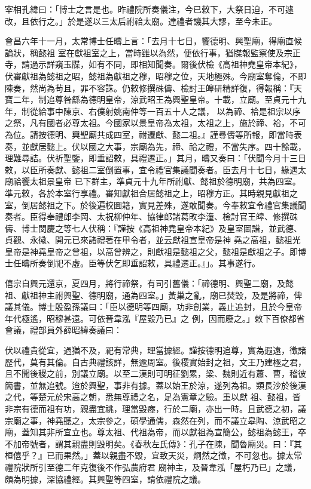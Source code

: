 \begin{pinyinscope}
 宰相孔緯曰：「博士之言是也。昨禮院所奏儀注，今已敕下，大祭日迫，不可遽改，且依行之。」於是遂以三太后祔祫太廟。達禮者譏其大謬，至今未正。



 會昌六年十一月，太常博士任疇上言：「去月十七日，饗德明、興聖廟，得廟直候論狀，稱懿祖
 室在獻祖室之上，當時雖以為然，便依行事，猶牒報監察使及宗正寺，請過示詳窺玉牒，如有不同，即相知聞奏。爾後伏檢《高祖神堯皇帝本紀》，伏審獻祖為懿祖之昭，懿祖為獻祖之穆，昭穆之位，天地極殊。今廟室奪倫，不即陳奏，然尚為茍且，罪不容誅。仍敕修撰硃儔、檢討王皞研精詳復，得報稱：『天寶二年，制追尊咎繇為德明皇帝，涼武昭王為興聖皇帝。十載，立廟。至貞元十九年，制從給事中陳京、右僕射姚南仲等一百五十人之議，
 以為禘、袷是祖宗以序之祭，凡有國者必尊太祖。今國家以景皇帝為太祖，太祖之上，施於禘、袷，不可為位。請按德明、興聖廟共成四室，祔遷獻、懿二祖。』謹尋儔等所報，即當時表奏，並獻居懿上。伏以國之大事，宗廟為先，禘、祫之禮，不當失序。四十餘載，理難尋詰。伏祈聖鑒，即垂詔敕，具禮遷正。」其月，疇又奏曰：「伏聞今月十三日敕，以臣所奏獻、懿祖二室倒置事，宜令禮官集議聞奏者。臣去月十七日，緣遇太廟祫饗太祖景皇帝
 已下群主，準貞元十九年所祔獻、懿祖於德明廟，共為四室。準元敕，各於本室行享禮。審知獻祖合居懿祖之上，昭穆方正。其時親見獻祖之室，倒居懿祖之下。於後遍校圖籍，實見差殊，遂敢聞奏。今奉敕宜令禮官集議聞奏者。臣得奉禮郎李岡、太祝柳仲年、協律郎諸葛畋李潼、檢討官王皞、修撰硃儔、博士閔慶之等七人伏稱：『謹按《高祖神堯皇帝本紀》及皇室圖譜，並武德、貞觀、永徽、開元已來諸禮著在甲令者，並云獻祖宣皇帝是神
 堯之高祖，懿祖光皇帝是神堯皇帝之曾祖，以高曾辨之，則獻祖是懿祖之父，懿祖是獻祖之子。即博士任疇所奏倒祀不虛。臣等伏乞即垂詔敕，具禮遷正。』」。其事遂行。



 僖宗自興元還京，夏四月，將行禘祭，有司引舊儀：「禘德明、興聖二廟，及懿祖、獻祖神主祔興聖、德明廟，通為四室。」黃巢之亂，廟已焚毀，及是將禘，俾議其儀。博士殷盈孫議曰：「臣以德明等四廟，功非創業，義止追封，且於今皇帝年代極遙，昭穆甚遠。可依晉韋泓『屋毀乃已』之
 例，因而廢之。」敕下百僚都省會議，禮部員外薛昭緯奏議曰：



 伏以禮貴從宜，過猶不及，祀有常典，理當據經。謹按德明追尊，實為遐遠，徵諸歷代，莫有其倫。自古典禮該詳，無逾周室。後稷實始封之祖，文王乃建極之君，且不聞後稷之前，別議立廟。以至二漢則可明征劉累，梁、魏則近有蕭、曹，稽彼簡書，並無追號。迨於興聖，事非有據。蓋以始王於涼，遂列為祖。類長沙於後漢之代，等楚元於宋高之朝，悉無尊禮之名，足為憲章之驗。重以獻
 祖、懿祖，皆非宗有德而祖有功，親盡宜祧，理當毀瘞，行於二廟，亦出一時。且武德之初，議宗廟之事，神堯聽之，太宗參之，碩學通儒，森然在列，而不議立皋陶、涼武昭之廟，蓋知其非所宜立也。尊太祖、代祖為帝，而以獻祖為宣簡公，懿祖為懿王，卒不加帝號者，謂其親盡則毀明矣。《春秋左氏傳》：孔子在陳，聞魯廟災。曰：『其桓僖乎？』已而果然。」蓋以親盡不毀，宜致天災，炯然之徵，不可忽也。據太常禮院狀所引至德二年克復後不作弘農府君
 廟神主，及晉韋泓「屋朽乃已」之議，頗為明據，深協禮經。其興聖等四室，請依禮院之議。




\end{pinyinscope}
